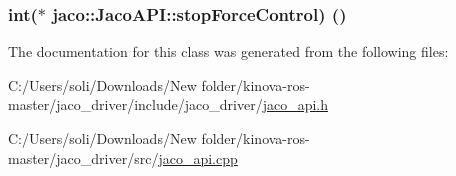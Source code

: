 \subsubsection[{\texorpdfstring{stop\+Force\+Control}{stopForceControl}}]{\setlength{\rightskip}{0pt plus 5cm}int($\ast$ jaco\+::\+Jaco\+A\+P\+I\+::stop\+Force\+Control) ()}\hypertarget{classjaco_1_1_jaco_a_p_i_ac3881ef354400b32a4d71796dba66d67}{}\label{classjaco_1_1_jaco_a_p_i_ac3881ef354400b32a4d71796dba66d67}


The documentation for this class was generated from the following files\+:\begin{DoxyCompactItemize}
\item 
C\+:/\+Users/soli/\+Downloads/\+New folder/kinova-\/ros-\/master/jaco\+\_\+driver/include/jaco\+\_\+driver/\hyperlink{jaco__api_8h}{jaco\+\_\+api.\+h}\item 
C\+:/\+Users/soli/\+Downloads/\+New folder/kinova-\/ros-\/master/jaco\+\_\+driver/src/\hyperlink{jaco__api_8cpp}{jaco\+\_\+api.\+cpp}\end{DoxyCompactItemize}
